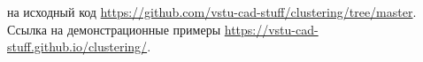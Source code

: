 \addtocounter{page}{11}


 на исходный код \url{https://github.com/vstu-cad-stuff/clustering/tree/master}.\\
Ссылка на демонстрационные примеры \url{https://vstu-cad-stuff.github.io/clustering/}.

%
%
%
%
%
%
%
%
%
%
%
%
